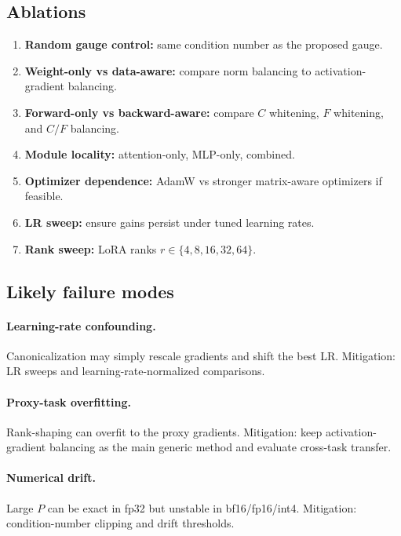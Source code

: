 \documentclass[11pt]{article}
\begin{document}
\subsection{Ablations}

\begin{enumerate}[leftmargin=*]
    \item \textbf{Random gauge control:} same condition number as the proposed gauge.
    \item \textbf{Weight-only vs data-aware:} compare norm balancing to activation-gradient balancing.
    \item \textbf{Forward-only vs backward-aware:} compare $C$ whitening, $F$ whitening, and $C/F$ balancing.
    \item \textbf{Module locality:} attention-only, MLP-only, combined.
    \item \textbf{Optimizer dependence:} AdamW vs stronger matrix-aware optimizers if feasible.
    \item \textbf{LR sweep:} ensure gains persist under tuned learning rates.
    \item \textbf{Rank sweep:} LoRA ranks $r\in\{4,8,16,32,64\}$.
\end{enumerate}

\subsection{Likely failure modes}

\paragraph{Learning-rate confounding.}
Canonicalization may simply rescale gradients and shift the best LR. Mitigation: LR sweeps and learning-rate-normalized comparisons.

\paragraph{Proxy-task overfitting.}
Rank-shaping can overfit to the proxy gradients. Mitigation: keep activation-gradient balancing as the main generic method and evaluate cross-task transfer.

\paragraph{Numerical drift.}
Large $P$ can be exact in fp32 but unstable in bf16/fp16/int4. Mitigation: condition-number clipping and drift thresholds.
\end{document}
